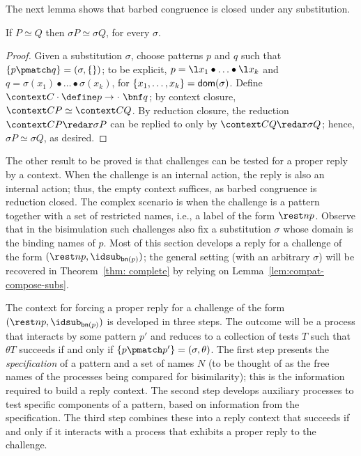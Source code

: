 \documentclass{LMCS}
\renewcommand{\beq}{\simeq}
\begin{document}
The next lemma shows that barbed congruence is closed under any substitution.

\begin{lem}
\label{lem:bcon-sub}
If $P\beq Q$ then $\sigma P\beq\sigma Q$, for every $\sigma$.
\end{lem}
\begin{proof}
Given a substitution $\sigma$, choose patterns $p$ and $q$ such that $\{p\pmatch q\}=(\sigma,\{\})$;
to be explicit, $p = \l x_1 \bullet \ldots\bullet \l x_k$ and $q = \sigma(x_1) \bullet \ldots \bullet \sigma(x_k)$,
for $\{x_1,\ldots,x_k\} = {\sf dom}(\sigma)$.
Define $\context C \cdot \define p\to \cdot\ \bnf q$;
by context closure, $\context C P\beq\context C Q$.
By reduction closure, the reduction $\context C P\redar \sigma P$ can be replied to 
only by $\context C Q\redar \sigma Q$; hence, $\sigma P\beq \sigma Q$, as desired.
\end{proof}

The other result to be proved is that challenges can be tested for a proper reply by a context.
When the challenge is an internal action, the reply is also an internal action; thus, the empty 
context suffices, as barbed congruence is reduction closed.
The complex scenario is when the challenge is a pattern together with a set of restricted names, 
i.e., a label of the form $\rest n p$.
Observe that in the bisimulation such challenges also fix a substitution $\sigma$ whose domain is the binding names of $p$.
Most of this section develops a reply for a challenge of the form $(\rest n p,\idsub_{{\sf bn}(p)})$;
the general setting (with an arbitrary $\sigma$) will be recovered in Theorem~\ref{thm: complete}
by relying on Lemma~\ref{lem:compat-compose-subs}.

The context for forcing a proper reply for a challenge of the form $(\rest n p,\idsub_{{\sf bn}(p)})$ is developed in three steps.
The outcome will be a process that interacts by some pattern $p'$ and reduces to a collection of tests $T$ such that $\theta T$ succeeds
if and only if $\{p\pmatch p'\}=(\sigma,\theta)$.
The first step presents the {\em specification} of a pattern and a set of names $N$ (to be thought of as the free names of the processes being compared for bisimilarity); this is the information required to build a reply context.
The second step develops auxiliary processes to test specific components of a pattern, based on information from the specification.
The third step combines these into a reply context that succeeds if and only if it interacts 
with a process that exhibits a proper reply to the challenge.
\end{document}
